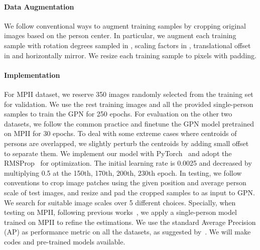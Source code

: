 \documentclass[10pt,twocolumn,letterpaper]{article}
\begin{document}
\vspace{-4mm}
\paragraph{Data Augmentation} We follow  conventional ways to augment training samples by cropping original images based on the  person center. In particular, we augment each training sample with rotation degrees sampled in , scaling  factors in , translational offset in  and horizontally mirror. We resize each training sample to   pixels with padding.

\vspace{-4mm}
\paragraph{Implementation} For  MPII dataset, we reserve 350 images randomly selected from the training set for validation. We use the rest training images and all the provided single-person  samples to train the GPN for 250 epochs. For evaluation on the other two datasets, we  follow the common practice and finetune the GPN model pretrained on MPII for 30 epochs. To deal with some extreme cases where centroids of persons are overlapped, we slightly perturb the centroids by adding small offset to separate them. We implement our model with PyTorch~\cite{paszke2017pytorch} and adopt the RMSProp~\cite{rmsprop2012} for optimization. The initial learning rate is 0.0025 and decreased by multiplying 0.5 at the 150th, 170th, 200th, 230th epoch. In testing, we follow conventions to crop image patches using the given position and  average person scale of test images, and resize and pad the cropped samples to  as input to GPN. We search for suitable image scales  over 5 different choices. Specially, when testing on  MPII, following previous works~\cite{cao2017realtime,newell2016associative}, we apply a single-person model~\cite{hpe:hourglass_arxiv15} trained on  MPII  to  refine the estimations. We use the standard Average Precision (AP) as performance metric on all the  datasets, as suggested by~\cite{hpe:deepercut_eccv16,xia2017joint}.  We will make
codes and pre-trained models available.
\end{document}
